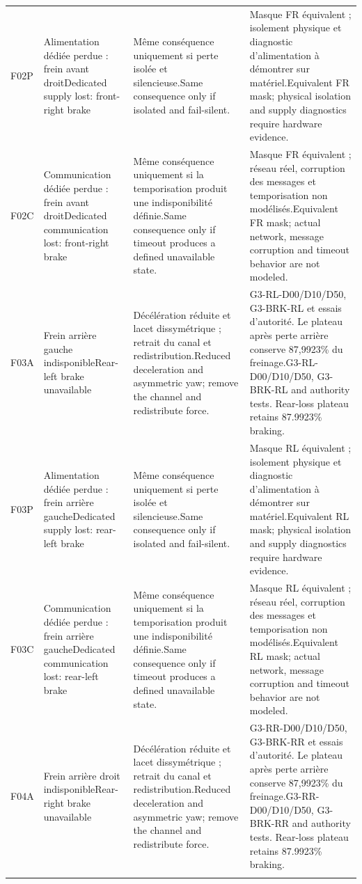 \documentclass[11pt,a4paper,oneside]{report}
\newcommand{\bi}[2]{\iffrench #2\else #1\fi}
\begin{document}
\begin{longtable}{@{}p{12mm}>{\raggedright\arraybackslash}p{33mm}>{\raggedright\arraybackslash}p{42mm}>{\raggedright\arraybackslash}p{57mm}@{}}
F02P & \bi{Dedicated supply lost: front-right brake}{Alimentation dédiée perdue : frein avant droit} & \bi{Same consequence only if isolated and fail-silent.}{Même conséquence uniquement si perte isolée et silencieuse.} & \bi{Equivalent FR mask; physical isolation and supply diagnostics require hardware evidence.}{Masque FR équivalent ; isolement physique et diagnostic d'alimentation à démontrer sur matériel.}\\\addlinespace
F02C & \bi{Dedicated communication lost: front-right brake}{Communication dédiée perdue : frein avant droit} & \bi{Same consequence only if timeout produces a defined unavailable state.}{Même conséquence uniquement si la temporisation produit une indisponibilité définie.} & \bi{Equivalent FR mask; actual network, message corruption and timeout behavior are not modeled.}{Masque FR équivalent ; réseau réel, corruption des messages et temporisation non modélisés.}\\\addlinespace
F03A & \bi{Rear-left brake unavailable}{Frein arrière gauche indisponible} & \bi{Reduced deceleration and asymmetric yaw; remove the channel and redistribute force.}{Décélération réduite et lacet dissymétrique ; retrait du canal et redistribution.} & \bi{G3-RL-D00/D10/D50, G3-BRK-RL and authority tests. Rear-loss plateau retains 87.9923\% braking.}{G3-RL-D00/D10/D50, G3-BRK-RL et essais d'autorité. Le plateau après perte arrière conserve 87,9923\% du freinage.}\\\addlinespace
F03P & \bi{Dedicated supply lost: rear-left brake}{Alimentation dédiée perdue : frein arrière gauche} & \bi{Same consequence only if isolated and fail-silent.}{Même conséquence uniquement si perte isolée et silencieuse.} & \bi{Equivalent RL mask; physical isolation and supply diagnostics require hardware evidence.}{Masque RL équivalent ; isolement physique et diagnostic d'alimentation à démontrer sur matériel.}\\\addlinespace
F03C & \bi{Dedicated communication lost: rear-left brake}{Communication dédiée perdue : frein arrière gauche} & \bi{Same consequence only if timeout produces a defined unavailable state.}{Même conséquence uniquement si la temporisation produit une indisponibilité définie.} & \bi{Equivalent RL mask; actual network, message corruption and timeout behavior are not modeled.}{Masque RL équivalent ; réseau réel, corruption des messages et temporisation non modélisés.}\\\addlinespace
F04A & \bi{Rear-right brake unavailable}{Frein arrière droit indisponible} & \bi{Reduced deceleration and asymmetric yaw; remove the channel and redistribute force.}{Décélération réduite et lacet dissymétrique ; retrait du canal et redistribution.} & \bi{G3-RR-D00/D10/D50, G3-BRK-RR and authority tests. Rear-loss plateau retains 87.9923\% braking.}{G3-RR-D00/D10/D50, G3-BRK-RR et essais d'autorité. Le plateau après perte arrière conserve 87,9923\% du freinage.}\\\addlinespace

\end{longtable}
\end{document}
